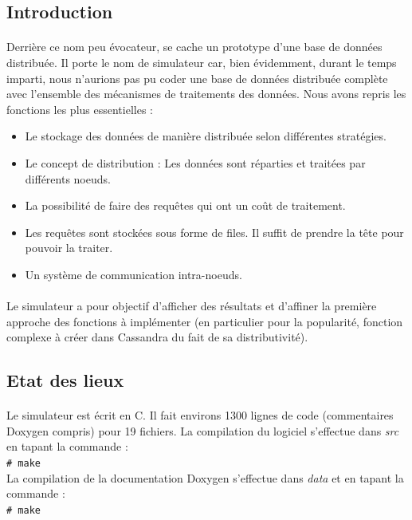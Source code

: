 \documentclass[12pt]{article}
\newcommand{\shellcmd}[1]{\\\indent\indent\texttt{\footnotesize\# #1}\\}
\begin{document}
\subsection{Introduction}

\paragraph{}Derrière ce nom peu évocateur, se cache un prototype d'une base de données distribuée. Il porte le nom de simulateur car, bien évidemment, durant le temps imparti, nous n'aurions pas pu coder une base de données distribuée complète avec l'ensemble des mécanismes de traitements des données. Nous avons repris les fonctions les plus essentielles :

\begin{itemize}
    \item Le stockage des données de manière distribuée selon différentes stratégies.
    \item Le concept de distribution : Les données sont réparties et traitées par différents noeuds.
    \item La possibilité de faire des requêtes qui ont un coût de traitement.
    \item Les requêtes sont stockées sous forme de files. Il suffit de prendre la tête pour pouvoir la traiter.
    \item Un système de communication intra-noeuds.
\end{itemize}

\paragraph{}Le simulateur a pour objectif d'afficher des résultats et d'affiner la première approche des fonctions à implémenter (en particulier pour la popularité, fonction complexe à créer dans Cassandra du fait de sa distributivité).

\subsection{Etat des lieux}

\paragraph{} Le simulateur est écrit en C. Il fait environs 1300 lignes de code (commentaires Doxygen compris) pour 19 fichiers. La compilation du logiciel s'effectue dans \textit{src} en tapant la commande  : \shellcmd{make}
La compilation de la documentation Doxygen s'effectue dans \textit{data} et en tapant la commande : \shellcmd{make}
\end{document}

